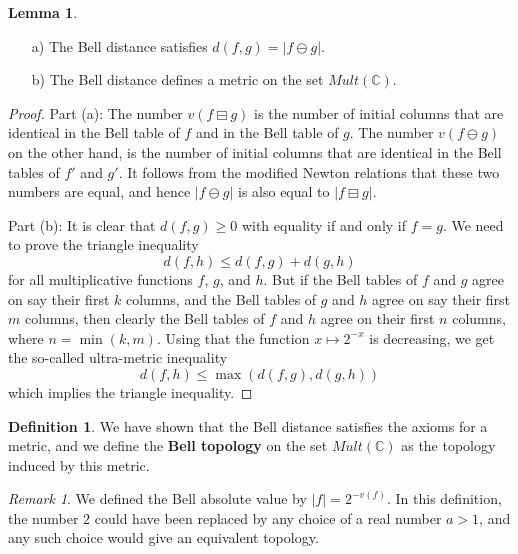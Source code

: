 \documentclass[a4paper]{article}
\theoremstyle{definition}
\newtheorem{definition}{Definition}[section]
\newtheorem{lemma}[theorem]{Lemma}
\theoremstyle{remark}
\newtheorem*{remark}{Remark}
\newcommand{\C}{\mathbb{C}}
\newcommand{\defhl}[1]{\textbf{#1}}
\begin{document}
\begin{lemma}
\begin{itemize}
\item[a)] The Bell distance satisfies $d(f, g) = \vert f \ominus g \vert$.
\item[b)] The Bell distance defines a metric on the set $Mult(\C)$.
\end{itemize}
\end{lemma}

\begin{proof}
Part (a): The number $v( f \boxminus g)$ is the number of initial columns that are identical in the Bell table of $f$ and in the Bell table of $g$. The number $v( f \ominus g)$ on the other hand, is the number of initial columns that are identical in the Bell tables of $f'$ and $g'$. It follows from the modified Newton relations that these two numbers are equal, and hence $\vert f \ominus g \vert$ is also equal to $\vert f \boxminus g \vert$.

Part (b): It is clear that $d(f, g) \geq 0$ with equality if and only if $f=g$. We need to prove the triangle inequality
$$  d(f, h)  \leq d(f, g) + d(g, h)   $$
for all multiplicative functions $f$, $g$, and $h$. But if the Bell tables of $f$ and $g$ agree on say their first $k$ columns, and the Bell tables of $g$ and $h$ agree on say their first $m$ columns, then clearly the Bell tables of $f$ and $h$ agree on their first $n$ columns, where $n = \min(k, m)$. Using that the function $x \mapsto 2^{-x}$ is decreasing, we get the so-called ultra-metric inequality
$$   d(f, h)  \leq \max (d(f, g) , d(g, h)  )    $$
which implies the triangle inequality.
\end{proof}

\begin{definition}
We have shown that the Bell distance satisfies the axioms for a metric, and we define the \defhl{Bell topology} on the set $Mult(\C)$ as the topology induced by this metric. 
\end{definition}

\begin{remark}
We defined the Bell absolute value by $\vert f \vert = 2^{-v(f)}$. In this definition, the number $2$ could have been replaced by any choice of a real number $a > 1$, and any such choice would give an equivalent topology.
\end{remark}




\end{document}

